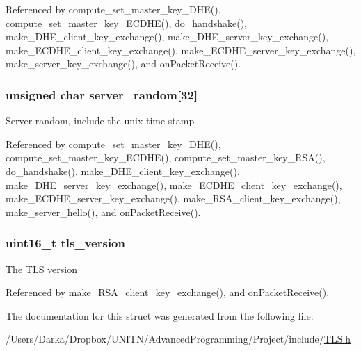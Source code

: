 Referenced by compute\+\_\+set\+\_\+master\+\_\+key\+\_\+\+D\+H\+E(), compute\+\_\+set\+\_\+master\+\_\+key\+\_\+\+E\+C\+D\+H\+E(), do\+\_\+handshake(), make\+\_\+\+D\+H\+E\+\_\+client\+\_\+key\+\_\+exchange(), make\+\_\+\+D\+H\+E\+\_\+server\+\_\+key\+\_\+exchange(), make\+\_\+\+E\+C\+D\+H\+E\+\_\+client\+\_\+key\+\_\+exchange(), make\+\_\+\+E\+C\+D\+H\+E\+\_\+server\+\_\+key\+\_\+exchange(), make\+\_\+server\+\_\+key\+\_\+exchange(), and on\+Packet\+Receive().

\subsubsection[{\texorpdfstring{server\+\_\+random}{server_random}}]{\setlength{\rightskip}{0pt plus 5cm}unsigned char server\+\_\+random\mbox{[}32\mbox{]}}\hypertarget{struct_t_l_s__parameters__t_a9159f146fbc286a8b55f4aa83396ae2f}{}\label{struct_t_l_s__parameters__t_a9159f146fbc286a8b55f4aa83396ae2f}
Server random, include the unix time stamp 

Referenced by compute\+\_\+set\+\_\+master\+\_\+key\+\_\+\+D\+H\+E(), compute\+\_\+set\+\_\+master\+\_\+key\+\_\+\+E\+C\+D\+H\+E(), compute\+\_\+set\+\_\+master\+\_\+key\+\_\+\+R\+S\+A(), do\+\_\+handshake(), make\+\_\+\+D\+H\+E\+\_\+client\+\_\+key\+\_\+exchange(), make\+\_\+\+D\+H\+E\+\_\+server\+\_\+key\+\_\+exchange(), make\+\_\+\+E\+C\+D\+H\+E\+\_\+client\+\_\+key\+\_\+exchange(), make\+\_\+\+E\+C\+D\+H\+E\+\_\+server\+\_\+key\+\_\+exchange(), make\+\_\+\+R\+S\+A\+\_\+client\+\_\+key\+\_\+exchange(), make\+\_\+server\+\_\+hello(), and on\+Packet\+Receive().

\subsubsection[{\texorpdfstring{tls\+\_\+version}{tls_version}}]{\setlength{\rightskip}{0pt plus 5cm}uint16\+\_\+t tls\+\_\+version}\hypertarget{struct_t_l_s__parameters__t_a8fd63193690a09b75e0aaf9b971ed3df}{}\label{struct_t_l_s__parameters__t_a8fd63193690a09b75e0aaf9b971ed3df}
The T\+LS version 

Referenced by make\+\_\+\+R\+S\+A\+\_\+client\+\_\+key\+\_\+exchange(), and on\+Packet\+Receive().



The documentation for this struct was generated from the following file\+:\begin{DoxyCompactItemize}
\item 
/\+Users/\+Darka/\+Dropbox/\+U\+N\+I\+T\+N/\+Advanced\+Programming/\+Project/include/\hyperlink{_t_l_s_8h}{T\+L\+S.\+h}\end{DoxyCompactItemize}
